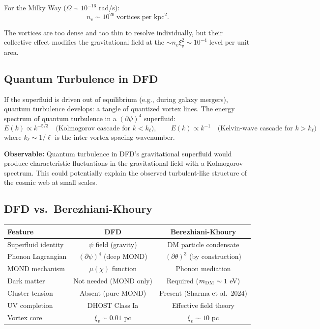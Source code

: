 \documentclass[11pt,a4paper]{article}
\begin{document}
For the Milky Way ($\Omega \sim 10^{-16}$ rad/s):
\begin{equation}
n_v \sim 10^{20}\;\text{vortices per kpc}^2.
\end{equation}

The vortices are too dense and too thin to resolve individually, but their collective effect modifies the gravitational field at the $\sim n_v \xi_v^2 \sim 10^{-4}$ level per unit area.

\subsection{Quantum Turbulence in DFD}

If the superfluid is driven out of equilibrium (e.g., during galaxy mergers), quantum turbulence develops: a tangle of quantized vortex lines. The energy spectrum of quantum turbulence in a $(\partial\psi)^4$ superfluid:
\begin{equation}
E(k) \propto k^{-5/3} \quad \text{(Kolmogorov cascade for $k < k_\ell$)}, \qquad E(k) \propto k^{-1} \quad \text{(Kelvin-wave cascade for $k > k_\ell$)}
\end{equation}
where $k_\ell \sim 1/\ell$ is the inter-vortex spacing wavenumber.

\textbf{Observable:} Quantum turbulence in DFD's gravitational superfluid would produce characteristic fluctuations in the gravitational field with a Kolmogorov spectrum. This could potentially explain the observed turbulent-like structure of the cosmic web at small scales.

\subsection{DFD vs.\ Berezhiani-Khoury}

\begin{center}
\begin{tabular}{lcc}
\toprule
\textbf{Feature} & \textbf{DFD} & \textbf{Berezhiani-Khoury} \\
\midrule
Superfluid identity & $\psi$ field (gravity) & DM particle condensate \\
Phonon Lagrangian & $(\partial\psi)^4$ (deep MOND) & $(\partial\theta)^3$ (by construction) \\
MOND mechanism & $\mu(\chi)$ function & Phonon mediation \\
Dark matter & Not needed (MOND only) & Required ($m_{\rm DM} \sim 1$ eV) \\
Cluster tension & Absent (pure MOND) & Present (Sharma et al.\ 2024) \\
UV completion & DHOST Class Ia & Effective field theory \\
Vortex core & $\xi_v \sim 0.01$ pc & $\xi_v \sim 10$ pc \\
\bottomrule
\end{tabular}
\end{center}
\end{document}
